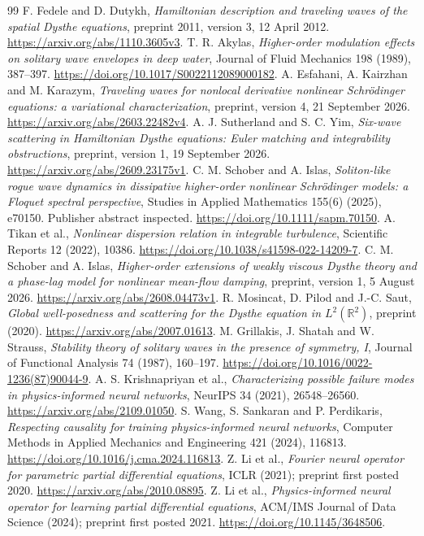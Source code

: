 \documentclass[11pt]{article}
\begin{document}
\clearpage
\begin{thebibliography}{99}\small
{} F. Fedele and D. Dutykh, \emph{Hamiltonian description and traveling
waves of the spatial Dysthe equations}, preprint 2011, version 3, 12 April 2012.
\url{https://arxiv.org/abs/1110.3605v3}.
 T. R. Akylas, \emph{Higher-order modulation effects on solitary
wave envelopes in deep water}, Journal of Fluid Mechanics 198 (1989), 387--397.
\url{https://doi.org/10.1017/S0022112089000182}.
 A. Esfahani, A. Kairzhan and M. Karazym, \emph{Traveling waves for
nonlocal derivative nonlinear Schr\"odinger equations: a variational
characterization}, preprint, version 4, 21 September 2026.
\url{https://arxiv.org/abs/2603.22482v4}.
 A. J. Sutherland and S. C. Yim, \emph{Six-wave scattering in
Hamiltonian Dysthe equations: Euler matching and integrability obstructions},
preprint, version 1, 19 September 2026.
\url{https://arxiv.org/abs/2609.23175v1}.
 C. M. Schober and A. Islas, \emph{Soliton-like rogue wave
dynamics in dissipative higher-order nonlinear Schr\"odinger models: a Floquet
spectral perspective}, Studies in Applied Mathematics 155(6) (2025), e70150.
Publisher abstract inspected. \url{https://doi.org/10.1111/sapm.70150}.
 A. Tikan et al., \emph{Nonlinear dispersion relation in integrable
turbulence}, Scientific Reports 12 (2022), 10386.
\url{https://doi.org/10.1038/s41598-022-14209-7}.
 C. M. Schober and A. Islas, \emph{Higher-order extensions of
weakly viscous Dysthe theory and a phase-lag model for nonlinear mean-flow
damping}, preprint, version 1, 5 August 2026.
\url{https://arxiv.org/abs/2608.04473v1}.
 R. Mosincat, D. Pilod and J.-C. Saut, \emph{Global well-posedness
and scattering for the Dysthe equation in $L^2(\mathbb R^2)$}, preprint (2020).
\url{https://arxiv.org/abs/2007.01613}.
 M. Grillakis, J. Shatah and W. Strauss, \emph{Stability theory of
solitary waves in the presence of symmetry, I}, Journal of Functional Analysis
74 (1987), 160--197. \url{https://doi.org/10.1016/0022-1236(87)90044-9}.
 A. S. Krishnapriyan et al., \emph{Characterizing possible failure
modes in physics-informed neural networks}, NeurIPS 34 (2021), 26548--26560.
\url{https://arxiv.org/abs/2109.01050}.
 S. Wang, S. Sankaran and P. Perdikaris, \emph{Respecting causality
for training physics-informed neural networks}, Computer Methods in Applied
Mechanics and Engineering 421 (2024), 116813.
\url{https://doi.org/10.1016/j.cma.2024.116813}.
 Z. Li et al., \emph{Fourier neural operator for parametric partial
differential equations}, ICLR (2021); preprint first posted 2020.
\url{https://arxiv.org/abs/2010.08895}.
 Z. Li et al., \emph{Physics-informed neural operator for learning
partial differential equations}, ACM/IMS Journal of Data Science (2024);
preprint first posted 2021. \url{https://doi.org/10.1145/3648506}.
\end{thebibliography}
\end{document}
